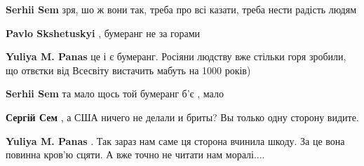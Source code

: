 \begin{itemize}
\begin{itemize}
\begin{itemize}
\textbf{Serhii Sem} зря, шо ж вони так, треба про всі казати, треба нести радість людям
\end{itemize}

 
\textbf{Pavlo Skshetuskyi} , бумеранг не за горами

\begin{itemize}
 
\textbf{Yuliya M. Panas} це і є бумеранг. Росіяни людству вже стільки горя зробили, що отвєтки від Всесвіту вистачить мабуть на 1000 років)

 
\textbf{Serhii Sem} та мало щось той бумеранг б'є , мало

 
\textbf{Сергій Сем} , а США ничего не делали и бриты? Вы только одну сторону видите.

 
\textbf{Yuliya M. Panas} . Так зараз нам саме ця сторона вчинила шкоду. За це вона повинна кров'ю сцяти. А вже точно не читати нам моралі....

 

\end{itemize}
\end{itemize}
\end{itemize}
